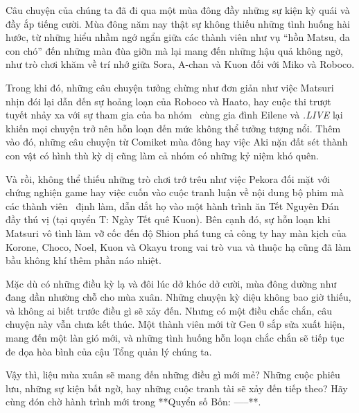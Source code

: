 \documentclass[main.tex]{subfiles}
\begin{document}
\color{black}

Câu chuyện của chúng ta đã đi qua một mùa đông đầy những sự kiện kỳ quái và đầy ắp tiếng cười. Mùa đông năm nay thật sự không thiếu những tình huống hài hước, từ những hiểu nhầm ngớ ngẩn giữa các thành viên như vụ ``hồn Matsu, da con chó'' đến những màn đùa giỡn mà lại mang đến những hậu quả không ngờ, như trò chơi khăm về trí nhớ giữa Sora, A-chan và Kuon đối với Miko và Roboco.

Trong khi đó, những câu chuyện tưởng chừng như đơn giản như việc Matsuri nhịn đói lại dẫn đến sự hoảng loạn của Roboco và Haato, hay cuộc thi trượt tuyết nhảy xa với sự tham gia của ba nhóm \hll\ cùng gia đình Eilene và \textit{.LIVE} lại khiến mọi chuyện trở nên hỗn loạn đến mức không thể tưởng tượng nổi. Thêm vào đó, những câu chuyện từ Comiket mùa đông hay việc Aki nặn đất sét thành con vật có hình thù kỳ dị cũng làm cả nhóm có những kỷ niệm khó quên.

Và rồi, không thể thiếu những trò chơi trớ trêu như việc Pekora đối mặt với chứng nghiện game hay việc cuốn vào cuộc tranh luận về nội dung bộ phim mà các thành viên \hll\ định làm, dẫn dắt họ vào một hành trình ăn Tết Nguyên Đán đầy thú vị (tại quyển T: Ngày Tết quê Kuon). Bên cạnh đó, sự hỗn loạn khi Matsuri vô tình làm vỡ cốc đến độ Shion phá tung cả công ty hay màn kịch của Korone, Choco, Noel, Kuon và Okayu trong vai trò vua và thuộc hạ cũng đã làm bầu không khí thêm phần náo nhiệt.

Mặc dù có những điều kỳ lạ và đôi lúc dở khóc dở cười, mùa đông dường như đang dần nhường chỗ cho mùa xuân. Những chuyện kỳ diệu không bao giờ thiếu, và không ai biết trước điều gì sẽ xảy đến. Nhưng có một điều chắc chắn, câu chuyện này vẫn chưa kết thúc. Một thành viên mới từ Gen 0 sắp sửa xuất hiện, mang đến một làn gió mới, và những tình huống hỗn loạn chắc chắn sẽ tiếp tục đe dọa hòa bình của cậu Tổng quản lý chúng ta.

Vậy thì, liệu mùa xuân sẽ mang đến những điều gì mới mẻ? Những cuộc phiêu lưu, những sự kiện bất ngờ, hay những cuộc tranh tài sẽ xảy đến tiếp theo? Hãy cùng đón chờ hành trình mới trong **Quyển số Bốn: -----**.
\end{document}
